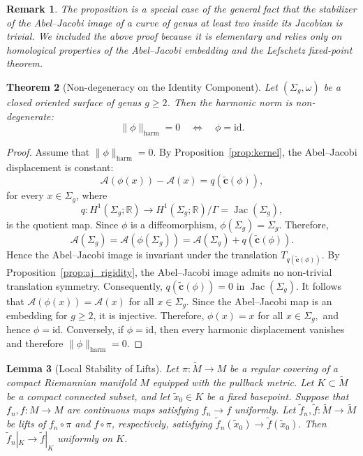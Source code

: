 \documentclass[11pt]{article}
\newtheorem{theorem}{Theorem}[section]
\newtheorem{lemma}[theorem]{Lemma}
\newtheorem{remark}[theorem]{Remark}
\theoremstyle{definition}
\begin{document}
	\begin{remark}
		The proposition is a special case of the general fact that the stabilizer of the
		Abel--Jacobi image of a curve of genus at least two inside its Jacobian is
		trivial. We included the above proof because it is elementary and relies only on
		homological properties of the Abel--Jacobi embedding and the Lefschetz
		fixed-point theorem.
	\end{remark}
	
	\begin{theorem}[Non-degeneracy on the Identity Component]
		\label{thm:non_deg_full}
		Let $(\Sigma_g,\omega)$ be a closed oriented surface of genus $g\ge2$. Then the
		harmonic norm is non-degenerate:
		\[
		\|\phi\|_{\mathrm{harm}}=0
		\quad\Longleftrightarrow\quad
		\phi=\mathrm{id}.
		\]
	\end{theorem}
	
	\begin{proof}
		Assume that $\|\phi\|_{\mathrm{harm}}=0.$ By Proposition~\ref{prop:kernel}, the
		Abel--Jacobi displacement is constant:
		\[
		\mathcal A(\phi(x))-\mathcal A(x) = q(\widetilde{\mathbf c}(\phi)),
		\]
		for every $x\in\Sigma_g$, where
		\[
		q:H^1(\Sigma_g;\mathbb R)\longrightarrow H^1(\Sigma_g;\mathbb R)/\Gamma =
		\operatorname{Jac}(\Sigma_g),
		\]
		is the quotient map. Since $\phi$ is a diffeomorphism, $\phi(\Sigma_g)=\Sigma_g.$
		Therefore,
		\[
		\mathcal A(\Sigma_g) = \mathcal A(\phi(\Sigma_g)) = \mathcal A(\Sigma_g) +
		q(\widetilde{\mathbf c}(\phi)).
		\]
		Hence the Abel--Jacobi image is invariant under the translation
		$T_{q(\widetilde{\mathbf c}(\phi))}.$ By Proposition~\ref{prop:aj_rigidity}, the
		Abel--Jacobi image admits no non-trivial translation symmetry. Consequently,
		$q(\widetilde{\mathbf c}(\phi))=0$ in $\operatorname{Jac}(\Sigma_g).$	It follows that $\mathcal A(\phi(x)) = \mathcal A(x)$ for all $x\in\Sigma_g.$
		Since the Abel--Jacobi map is an embedding for $g\ge2$, it is injective.
		Therefore, $\phi(x)=x$ for all $x\in\Sigma_g,$ and hence $\phi=\mathrm{id}.$
		Conversely, if $\phi=\mathrm{id}$, then every harmonic displacement vanishes and
		therefore $\|\phi\|_{\mathrm{harm}}=0.$ 
	\end{proof}
	
	\begin{lemma}[Local Stability of Lifts]
		\label{lem:stability_lifts}
		Let $\pi:\widetilde{M}\to M$ be a regular covering of a compact Riemannian
		manifold $M$ equipped with the pullback metric. Let $K\subset\widetilde M$ be a
		compact connected subset, and let $\tilde{x}_0\in K$ be a fixed basepoint.
		Suppose that $f_n,f:M\to M$ are continuous maps satisfying $f_n\to f$ uniformly.
		Let $\widetilde f_n,\widetilde f:\widetilde M\to\widetilde M$ be lifts of
		$f_n\circ\pi$ and $f\circ\pi$, respectively, satisfying $\widetilde
		f_n(\tilde{x}_0)\longrightarrow \widetilde f(\tilde{x}_0).$ Then $\widetilde
		f_n|_K\longrightarrow \widetilde f|_K$ uniformly on $K$.
	\end{lemma}
	
\end{document}
